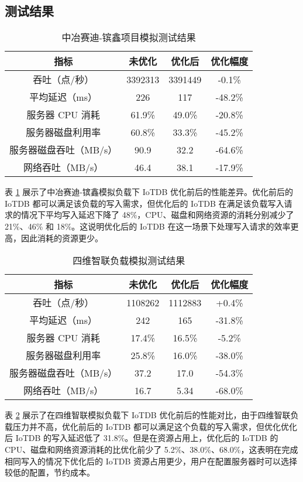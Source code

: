 \subsection{测试结果}

\begin{table}
  \centering
  \caption{中冶赛迪-镔鑫项目模拟测试结果}
  \begin{tabular}{cccc}
    \toprule 
    指标 &  未优化  & 优化后 & 优化幅度 \\
    \midrule
    吞吐（点/秒） & 3392313 & 3391449 & -0.1\%\\
    平均延迟（ms） & 226 & 	117 & -48.2\%\\
    服务器 CPU 消耗 & 61.9\% & 	49.0\% & -20.8\%\\
    服务器磁盘利用率 & 60.8\% & 	33.3\% & -45.2\%\\
    服务器磁盘吞吐（MB/s） & 90.9 & 32.2 & -64.6\% \\
    网络吞吐（MB/s） & 46.4 & 38.1 & -17.9\%\\
    \bottomrule
  \end{tabular}
  \label{tabular:zysd-test-result}
\end{table}
表 \ref{tabular:zysd-test-result} 展示了中冶赛迪-镔鑫模拟负载下 IoTDB 优化前后的性能差异。优化前后的 IoTDB 都可以满足该负载的写入需求，但优化后的 IoTDB 在满足该负载写入请求的情况下平均写入延迟下降了 48\%，CPU、磁盘和网络资源的消耗分别减少了 21\%、46\% 和 18\%。这说明优化后的 IoTDB 在这一场景下处理写入请求的效率更高，因此消耗的资源更少。


\begin{table}
  \centering
  \caption{四维智联负载模拟测试结果}
  \begin{tabular}{cccc}
    \toprule 
    指标 &  未优化  & 优化后 & 优化幅度 \\
    \midrule  
    吞吐（点/秒） & 1108262 & 1112883 & +0.4\%\\  
    平均延迟（ms） & 242 & 165 & -31.8\%\\  
    服务器 CPU 消耗 & 17.4\% & 16.5\% & -5.2\%\\  
    服务器磁盘利用率 & 25.8\% & 16.0\% & -38.0\%\\  
    服务器磁盘吞吐（MB/s） & 37.2 & 17.0 & -54.3\% \\  
    网络吞吐（MB/s） & 16.7 & 5.34 & -68.0\%\\  
    \bottomrule 
  \end{tabular}
  \label{tabular:swzl-test-result}
\end{table}
表 \ref{tabular:swzl-test-result} 展示了在四维智联模拟负载下 IoTDB 优化前后的性能对比，由于四维智联负载压力并不高，优化前后的 IoTDB 都可以满足这个负载的写入需求，但优化优化后 IoTDB 的写入延迟低了 31.8\%。但是在资源占用上，优化后的 IoTDB 的 CPU、磁盘和网络资源消耗的比优化前少了 5.2\%、38.0\%、68.0\%，这表明在完成相同写入的情况下优化后的 IoTDB 资源占用更少，用户在配置服务器时可以选择较低的配置，节约成本。

